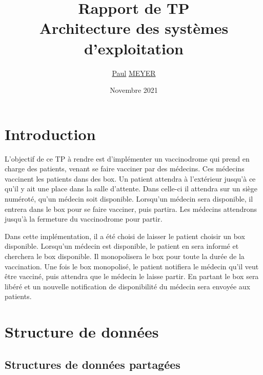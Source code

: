 \documentclass[a4paper]{article}
\title{Rapport de TP \\ Architecture des systèmes d'exploitation}
\author{\underline{Paul} \underline{MEYER}}
\date{Novembre 2021}
\makeatletter
\newenvironment{expl}{%
  \begin{list}{}{%
    \small\itshape%
    \topsep\z@%
    \listparindent0pt%
    \parsep0.75\baselineskip%
    \setlength{\leftmargin}{20mm}%
    \setlength{\rightmargin}{20mm}%
  }
    \item[]}%
    {\end{list}}
\makeatother
\begin{document}
  \maketitle



  \section{Introduction}

  \begin{expl}
    L'objectif de ce TP à rendre est d'implémenter un vaccinodrome qui prend en charge des patients, venant se faire
    vacciner par des médecins. Ces médecins vaccinent les patients dans des box. Un patient attendra à l'extérieur jusqu'à
    ce qu'il y ait une place dans la salle d'attente. Dans celle-ci il attendra sur un siège numéroté, qu'un médecin soit disponible. Lorsqu'un médecin sera disponible, il entrera dans le box pour se faire vacciner, puis partira. Les médecins attendrons jusqu'à la fermeture du vaccinodrome pour partir.

    Dans cette implémentation, il a été choisi de laisser le patient choisir un box disponible.
    Lorsqu'un médecin est disponible, le patient en sera informé et cherchera le box disponible.
    Il monopolisera le box pour toute la durée de la vaccination. Une fois le box monopolisé, le patient notifiera le médecin qu'il veut être vacciné, puis attendra que le médecin le laisse partir. En partant le box sera libéré et un nouvelle notification de disponibilité du médecin sera envoyée aux patients.
  \end{expl}

  \section{Structure de données}

  \subsection{Structures de données partagées}\label{sec-shm}
\end{document}
